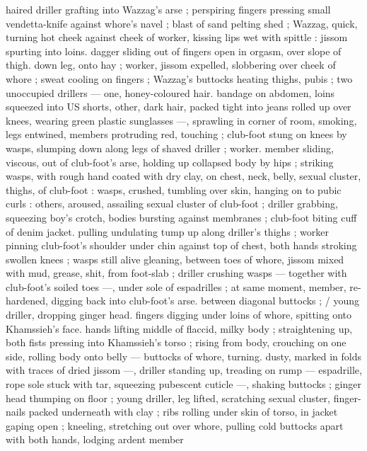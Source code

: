 haired driller grafting into Wazzag's arse ; perspiring fingers 
pressing small vendetta-knife against whore's navel ; blast of sand 
pelting shed ; Wazzag, quick, turning hot cheek against cheek of 
worker, kissing lips wet with spittle : jissom spurting into loins. 
dagger sliding out of fingers open in orgasm, over slope of thigh. 
down leg, onto hay ; worker, jissom expelled, slobbering over cheek 
of whore ; sweat cooling on fingers ; Wazzag's buttocks heating 
thighs, pubis ; two unoccupied drillers --- one, honey-coloured hair. 
bandage on abdomen, loins squeezed into US shorts, other, dark 
hair, packed tight into jeans rolled up over knees, wearing green 
plastic sunglasses ---, sprawling in corner of room, smoking, legs 
entwined, members protruding red, touching ; club-foot stung on 
knees by wasps, slumping down along legs of shaved driller ; worker. 
member sliding, viscous, out of club-foot's arse, holding up 
collapsed body by hips ; striking wasps, with rough hand coated with 
dry clay, on chest, neck, belly, sexual cluster, thighs, of club-foot : 
wasps, crushed, tumbling over skin, hanging on to pubic curls : 
others, aroused, assailing sexual cluster of club-foot ; driller 
grabbing, squeezing boy's crotch, bodies bursting against 
membranes ; club-foot biting cuff of denim jacket. pulling undulating 
tump up along driller's thighs ; worker pinning club-foot's shoulder 
under chin against top of chest, both hands stroking swollen knees 
; wasps still alive gleaning, between toes of whore, jissom mixed with 
mud, grease, shit, from foot-slab ; driller crushing wasps --- together 
with club-foot's soiled toes ---, under sole of espadrilles ; at same 
moment, member, re-hardened, digging back into club-foot's arse. 
between diagonal buttocks ; {\slash} young driller, dropping ginger head. 
fingers digging under loins of whore, spitting onto Khamssieh's face. 
hands lifting middle of flaccid, milky body ; straightening up, both 
fists pressing into Khamssieh's torso ; rising from body, crouching on 
one side, rolling body onto belly --- buttocks of whore, turning. 
dusty, marked in folds with traces of dried jissom ---, driller standing 
up, treading on rump --- espadrille, rope sole stuck with tar, 
squeezing pubescent cuticle ---, shaking buttocks ; ginger head 
thumping on floor ; young driller, leg lifted, scratching sexual cluster, 
finger-nails packed underneath with clay ; ribs rolling under skin of 
torso, in jacket gaping open ; kneeling, stretching out over whore, 
pulling cold buttocks apart with both hands, lodging ardent member 
